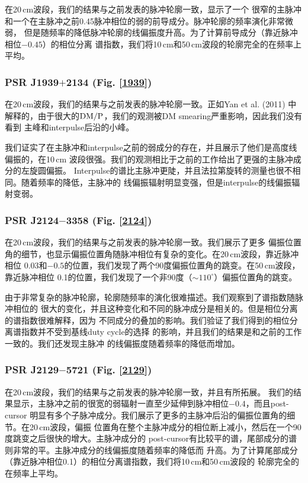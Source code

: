 在20\,cm波段，我们的结果与之前发表的脉冲轮廓一致\supercite{Ord04,Yan11a}，显示了一个
很窄的主脉冲和一个在主脉冲之前0.45脉冲相位的弱的前导成分。脉冲轮廓的频率演化非常微弱，
但是随频率的降低脉冲轮廓的线偏振度升高。为了计算前导成分（靠近脉冲相位$-0.45$）的相位分离
谱指数，我们将10\,cm和50\,cm波段的轮廓完全的在频率上平均。

\subsubsection{PSR J1939$+$2134 (Fig. \ref{1939})}

在20\,cm波段，我们的结果与之前发表的脉冲轮廓一致\supercite{Yan11a}。正如Yan et al. (2011)
中解释的，由于很大的$\rm{DM}/P$，我们的观测被DM smearing严重影响，因此我们没有看到
主峰和interpulse后沿的小峰\supercite{Thorsett90,Stairs99,Ord04}。

我们证实了在主脉冲和interpulse之前的弱成分的存在，并且展示了他们是高度线偏振的，在10\,cm
波段很强。我们的观测相比于之前的工作\supercite{Yan11a}给出了更强的主脉冲成分的左旋圆偏振。
Interpulse的谱比主脉冲更陡，并且法拉第旋转的测量也很不相同。随着频率的降低，主脉冲的
线偏振辐射明显变强，但是interpulse的线偏振辐射变弱。


\subsubsection{PSR J2124$-$3358 (Fig. \ref{2124})}

在20\,cm波段，我们的结果与之前发表的脉冲轮廓一致\supercite{Yan11a}。我们展示了更多
偏振位置角的细节，也显示偏振位置角随脉冲相位有复杂的变化。在20\,cm波段，靠近脉冲相位
0.03和$-0.5$的位置，我们发现了两个90度偏振位置角的跳变。在50\,cm波段，靠近脉冲相位
0.1的位置，我们发现了一个非90度（$\sim110^{\circ}$）偏振位置角的跳变。

由于非常复杂的脉冲轮廓，轮廓随频率的演化很难描述。我们观察到了谱指数随脉冲相位的
很大的变化，并且这种变化和不同的脉冲成分是相关的。但是相位分离的谱指数很难解释，因为
不同成分的叠加的影响。我们验证了我们得到的相位分离谱指数并不受到基线duty cycle的选择
的影响，并且我们的结果是和之前的工作一致的\supercite{Manchester04}。我们还发现主脉冲
的线偏振度随着频率的降低而增加。

\subsubsection{PSR J2129$-$5721 (Fig. \ref{2129})}

在20\,cm波段，我们的结果与之前发表的脉冲轮廓一致，并且有所拓展\supercite{Yan11a}。
我们的结果显示，主脉冲之前的很宽的弱辐射一直至少延伸到脉冲相位$-0.4$，而且post-cursor
明显有多个子脉冲成分。我们展示了更多的主脉冲后沿的偏振位置角的细节。在20\,cm波段，偏振
位置角在整个主脉冲成分的相位断上减小，然后在一个90度跳变之后很快的增大。主脉冲成分的
post-cursor有比较平的谱，尾部成分的谱则非常的平。主脉冲成分的线偏振度随着频率的降低而
升高。为了计算尾部成分（靠近脉冲相位0.1）的相位分离谱指数，我们将10\,cm和50\,cm波段的
轮廓完全的在频率上平均。

